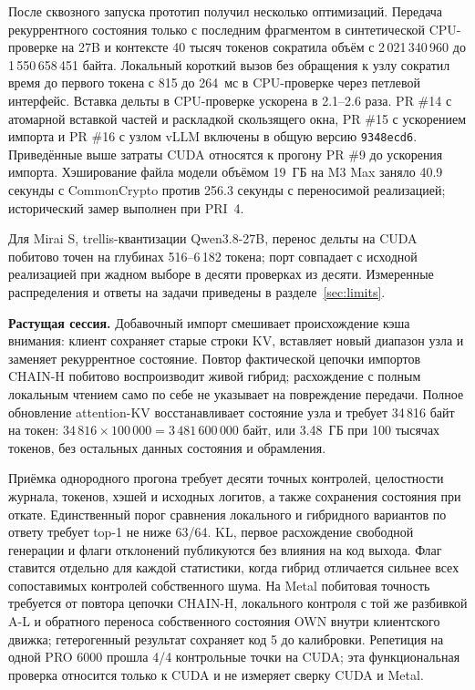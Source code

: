 После сквозного запуска прототип получил несколько оптимизаций. Передача рекуррентного состояния
только с последним фрагментом в синтетической CPU-проверке на 27B и контексте 40 тысяч токенов
сократила объём с 2\,021\,340\,960 до 1\,550\,658\,451 байта. Локальный короткий вызов без обращения
к узлу сократил время до первого токена с 815 до 264~мс в CPU-проверке через петлевой интерфейс.
Вставка дельты в CPU-проверке ускорена в 2.1--2.6 раза. PR \#14 с атомарной вставкой частей
и раскладкой скользящего окна, PR \#15 с ускорением импорта и PR \#16 с узлом vLLM включены
в общую версию \texttt{9348ecd6}. Приведённые выше затраты CUDA относятся к прогону PR \#9
до ускорения импорта.
Хэширование файла модели объёмом 19~ГБ на M3 Max заняло 40.9 секунды с CommonCrypto
против 256.3 секунды с переносимой реализацией; исторический замер выполнен при PRI~4.

Для Mirai S, trellis-квантизации Qwen3.8-27B, перенос дельты на CUDA побитово точен на глубинах
516--6\,182 токена; порт совпадает с исходной реализацией при жадном выборе в десяти проверках из десяти.
Измеренные распределения и ответы на задачи приведены в разделе~\ref{sec:limits}.

\textbf{Растущая сессия.} Добавочный импорт смешивает происхождение кэша внимания:
клиент сохраняет старые строки KV, вставляет новый диапазон узла и заменяет рекуррентное состояние.
Повтор фактической цепочки импортов CHAIN-H побитово воспроизводит живой гибрид;
расхождение с полным локальным чтением само по себе не указывает на повреждение передачи.
Полное обновление attention-KV восстанавливает состояние узла и требует
34\,816 байт на токен: $34\,816\times100\,000=3\,481\,600\,000$ байт, или 3.48~ГБ при
100 тысячах токенов, без остальных данных состояния и обрамления.

Приёмка однородного прогона требует десяти точных контролей, целостности журнала, токенов,
хэшей и исходных логитов, а также сохранения состояния при откате. Единственный порог
сравнения локального и гибридного вариантов по ответу требует top-1 не ниже 63/64.
KL, первое расхождение свободной генерации и флаги отклонений публикуются без влияния на код выхода.
Флаг ставится отдельно для каждой статистики, когда гибрид отличается сильнее всех сопоставимых
контролей собственного шума. На Metal побитовая точность требуется от повтора цепочки CHAIN-H, локального контроля с той же
разбивкой A-L и обратного переноса собственного состояния OWN внутри клиентского движка;
гетерогенный результат сохраняет код 5 до калибровки.
Репетиция на одной PRO 6000 прошла 4/4 контрольные точки на CUDA; эта функциональная проверка относится только к CUDA и не измеряет сверку CUDA и Metal.

